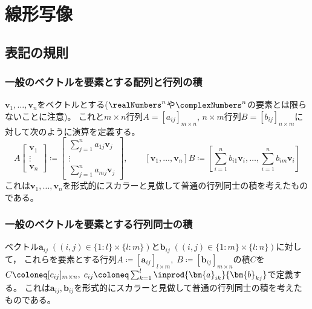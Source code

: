 \chapter{線形写像}
    \section{表記の規則}
        \subsection{一般のベクトルを要素とする配列と行列の積}
            $\bm{v}_1,\dotsc,\bm{v}_n$をベクトルとする($\realNumbers^n$や$\complexNumbers^n$の要素とは限らないことに注意)。
            これと$m\times n$行列$A=[a_{ij}]_{m\times n}$, $n\times m$行列$B=[b_{ij}]_{n\times m}$に対して次のように演算を定義する。
            \[
                A
                \begin{bmatrix}
                    \bm{v}_1 \\
                    \vdots \\
                    \bm{v}_n
                \end{bmatrix} \coloneq
                \begin{bmatrix}
                    \sum_{j=1}^n a_{1j}\bm{v}_j \\
                    \vdots \\
                    \sum_{j=1}^n a_{mj}\bm{v}_j
                \end{bmatrix},
                \qquad
                [\bm{v}_1,\dotsc,\bm{v}_n]B \coloneq
                \left[\sum_{i=1}^n b_{i1}\bm{v}_i, \dotsc, \sum_{i=1}^n b_{im}\bm{v}_i \right]
            \]
            これは$\bm{v}_1,\dotsc,\bm{v}_n$を形式的にスカラーと見做して普通の行列同士の積を考えたものである。
        \subsection{一般のベクトルを要素とする行列同士の積}
            ベクトル$\bm{a}_{ij}\;((i,j)\in\{1:l\}\times\{l:m\})$と$\bm{b}_{ij}\;((i,j)\in\{1:m\}\times\{l:n\})$に対して，
            これらを要素とする行列$A\coloneq[\bm{a}_{ij}]_{l\times m},\;B\coloneq[\bm{b}_{ij}]_{m\times n}$の積$C$を
            $C\coloneq[c_{ij}]_{m\times n},\;c_{ij} \coloneq \sum_{k=1}^l \inprod{\bm{a}_{ik}}{\bm{b}_{kj}}$で定義する。
            これは$\bm{a}_{ij},\bm{b}_{ij}$を形式的にスカラーと見做して普通の行列同士の積を考えたものである。
